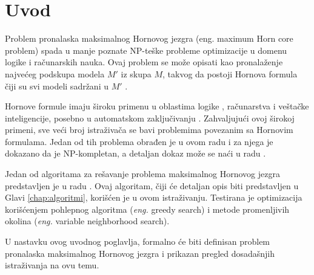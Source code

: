 \documentclass[12pt,oneside]{memoir}
\begin{document}
\frontmatter
\naslovna
\komisija
\apstrakt
\tableofcontents*

\mainmatter

\chapter{Uvod}
\label{chp:uvod}
Problem pronalaska maksimalnog Hornovog jezgra (eng. maximum Horn core problem) spada u manje poznate NP-teške probleme optimizacije u domenu logike i računarskih nauka. Ovaj problem se može opisati kao pronalaženje najvećeg podskupa modela \(M'\) iz skupa \(M\), takvog da postoji Hornova formula čiji su svi modeli sadržani u \(M'\) \cite{HCproblem}.

Hornove formule imaju široku primenu u oblastima logike \cite{doc43,doc2}, računarstva i veštačke inteligencije, posebno u automatskom zaključivanju \cite{doc41,doc42}. Zahvaljujući ovoj širokoj primeni, sve veći broj istraživača se bavi problemima povezanim sa Hornovim formulama. Jedan od tih problema obrađen je u ovom radu i za njega je dokazano da je NP-kompletan, a detaljan dokaz može se naći u radu \cite{doc3}.



Jedan od algoritama za rešavanje problema maksimalnog Hornovog jezgra predstavljen je u radu \cite{doc1}. Ovaj algoritam, čiji će detaljan opis biti predstavljen u Glavi \ref{chap:algoritmi}, korišćen je u ovom istraživanju. Testirana je optimizacija korišćenjem pohlepnog algoritma (\textit{eng.} greedy search) i metode promenljivih okolina (\textit{eng.} variable neighborhood search).

U nastavku ovog uvodnog poglavlja, formalno će biti definisan problem pronalaska maksimalnog Hornovog jezgra i prikazan pregled dosadašnjih istraživanja na ovu temu.
\end{document}
